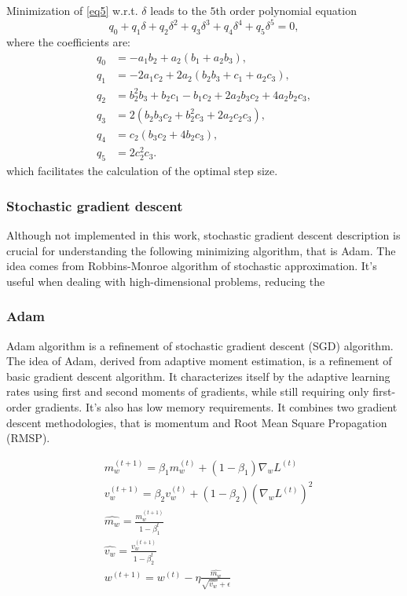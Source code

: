 Minimization of \ref{eq5} w.r.t. $\delta$ leads to the $5$th order polynomial equation
\begin{equation}
	q_0 + q_1 \delta + q_2 \delta^2 + q_3 \delta^3 + q_4 \delta^4 +q_5 \delta^5 = 0,
\end{equation}
where the coefficients are:
\begin{align*}
	q_0 &= -a_1 b_2 + a_2 (b_1 + a_2 b_3),\\
	q_1 &= -2 a_1 c_2 + 2 a_2 (b_2 b_3 + c_1 + a_2 c_3),\\ 
	q_2 &= b_2^2 b_3 + b_2 c_1 - b_1 c_2 + 2 a_2 b_3 c_2 + 4 a_2 b_2 c_3, \\
	q_3 &= 2 (b_2 b_3 c_2 + b_2^2 c_3 + 2 a_2 c_2 c_3),\\
	q_4 &= c_2 (b_3 c_2 + 4 b_2 c_3),\\
	q_5 &= 2 c_2^2 c_3.
\end{align*}
\noindent which facilitates the calculation of the optimal step size.

\subsubsection{Stochastic gradient descent}

Although not implemented in this work, stochastic gradient descent description is crucial for understanding the following minimizing algorithm, that is Adam. The idea comes from Robbins-Monroe\cite{robbins-monroe} algorithm of stochastic approximation. It's useful when dealing with high-dimensional problems, reducing the 

\subsubsection{Adam}

Adam algorithm is a refinement of stochastic gradient descent (SGD) algorithm. The idea of
Adam, derived from adaptive moment estimation, is a refinement of basic gradient descent algorithm. It characterizes itself by the adaptive learning rates using first and second moments of gradients, while still requiring only first-order gradients. It's also has low memory requirements. It combines two gradient descent methodologies, that is momentum and Root Mean Square Propagation (RMSP).



\begin{align*}
		&m_w^{(t+1)} = \beta_1 m_w^{(t)} + (1 - \beta_1) \nabla_w L^{(t)} \\
		&v_w^{(t+1)} = \beta_2 v_w^{(t)} + (1 - \beta_2) (\nabla_w L^{(t)})^2 \\
		&\hat{m_w} = \frac{m_w^{(t+1)}}{1-\beta_1^t} \\
		&\hat{v_w} = \frac{v_w^{(t+1)}}{1-\beta_2^t} \\
		&w^{(t+1)} = w^{(t)} - \eta \frac{\hat{m_w}}{\sqrt{\hat{v_w}} + \epsilon}
\end{align*}

